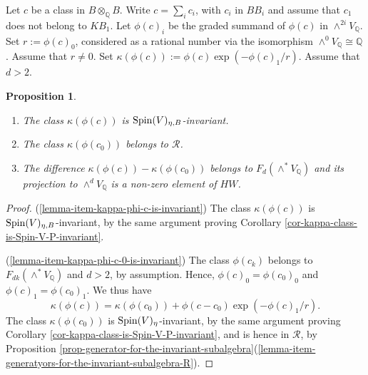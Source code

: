 \documentclass[12pt]{amsart}
\numberwithin{equation}{subsection}
\theoremstyle{plain}
\newtheorem{prop}[thm]{Proposition}
\theoremstyle{definition}
\newtheorem{rem}[thm]{Remark}
\newcommand{\QQ}{{\mathbb Q}}
\newcommand{\R}{{\mathcal R}}
\newcommand{\Spin}{{\rm Spin}}
\begin{document}
{%



Let $c$ be a class in $B\otimes_\QQ B$. 
Write $c=\sum_i c_i$, with $c_i$ in $BB_i$ and assume that $c_1$ does not belong to $KB_1$.
Let $\phi(c)_i$ be the graded summand of $\phi(c)$ in $\wedge^{2i}V_\QQ$. Set $r:=\phi(c)_0$, considered as a rational number via the isomorphism $\wedge^0V_\QQ\cong \QQ$. Assume that $r\neq 0$. Set
$\kappa(\phi(c)):=\phi(c)\exp\left(-\phi(c)_1/r\right)$. Assume that $d>2$. 

\begin{prop}
\label{prop-kappa-class-of-image-of-secant-class-yields-a-HW-class}
\begin{enumerate}
\item
\label{lemma-item-kappa-phi-c-is-invariant}
The class $\kappa(\phi(c))$ is $\Spin(V)_{\eta,B}$-invariant. 
\item
\label{lemma-item-kappa-phi-c-0-is-invariant}
The class $\kappa(\phi(c_0))$ belongs to $\R$. 
\item
\label{lemma-item-difference-projects-to-HW}
The difference
$\kappa(\phi(c))-\kappa(\phi(c_0))$ belongs to $F_d(\wedge^*V_\QQ)$ and its projection to $\wedge^dV_\QQ$ is a non-zero element of $HW$.
\end{enumerate}
\end{prop}

\begin{proof}
(\ref{lemma-item-kappa-phi-c-is-invariant}) 
The class $\kappa(\phi(c))$ is $\Spin(V)_{\eta,B}$-invariant, by the same argument proving Corollary \ref{cor-kappa-class-is-Spin-V-P-invariant}.

(\ref{lemma-item-kappa-phi-c-0-is-invariant})
The class $\phi(c_k)$ belongs to $F_{dk}(\wedge^*V_\QQ)$ and $d>2$, by assumption. Hence, $\phi(c)_0=\phi(c_0)_0$ and 
$\phi(c)_1=\phi(c_0)_1$. 
We thus have
\[
\kappa(\phi(c))=\kappa(\phi(c_0))+\phi(c-c_0)\exp\left(-\phi(c)_1/r\right).
\]
The class $\kappa(\phi(c_0))$ is $\Spin(V)_\eta$-invariant, by the same argument proving Corollary \ref{cor-kappa-class-is-Spin-V-P-invariant},
and is hence in $\R$, by Proposition \ref{prop-generator-for-the-invariant-subalgebra}(\ref{lemma-item-generatyors-for-the-invariant-subalgebra-R}). 


\end{proof}}
\end{document}
